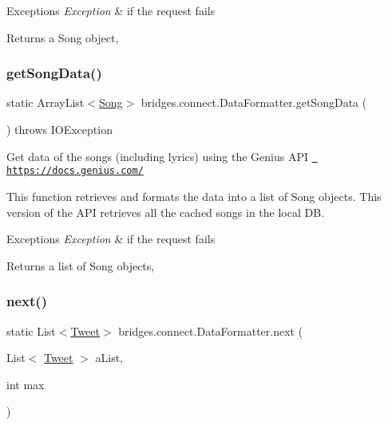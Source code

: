 \begin{DoxyExceptions}{Exceptions}
{\em Exception} & if the request fails\\
\hline
\end{DoxyExceptions}
\begin{DoxyReturn}{Returns}
a Song object, 
\end{DoxyReturn}
\mbox{\label{classbridges_1_1connect_1_1_data_formatter_a6a2ded4ccec11234434b83a3e408fb67}} 
\subsubsection{\texorpdfstring{getSongData()}{getSongData()}}
{\footnotesize\ttfamily static Array\+List$<$\mbox{\hyperlink{classbridges_1_1data__src__dependent_1_1_song}{Song}}$>$ bridges.\+connect.\+Data\+Formatter.\+get\+Song\+Data (\begin{DoxyParamCaption}{ }\end{DoxyParamCaption}) throws I\+O\+Exception\hspace{0.3cm}{\ttfamily [static]}}

Get data of the songs (including lyrics) using the Genius A\+PI \href{https://docs.genius.com/}{\texttt{ https\+://docs.\+genius.\+com/}}

This function retrieves and formats the data into a list of Song objects. This version of the A\+PI retrieves all the cached songs in the local DB.


\begin{DoxyExceptions}{Exceptions}
{\em Exception} & if the request fails\\
\hline
\end{DoxyExceptions}
\begin{DoxyReturn}{Returns}
a list of Song objects, 
\end{DoxyReturn}
\mbox{\label{classbridges_1_1connect_1_1_data_formatter_a3d0b2d2e0384d2a537bb61fbeb3d00a4}} 
\subsubsection{\texorpdfstring{next()}{next()}\hspace{0.1cm}{\footnotesize\ttfamily [1/2]}}
{\footnotesize\ttfamily static List$<$\mbox{\hyperlink{classbridges_1_1data__src__dependent_1_1_tweet}{Tweet}}$>$ bridges.\+connect.\+Data\+Formatter.\+next (\begin{DoxyParamCaption}\item[{List$<$ \mbox{\hyperlink{classbridges_1_1data__src__dependent_1_1_tweet}{Tweet}} $>$}]{a\+List,  }\item[{int}]{max }\end{DoxyParamCaption})\hspace{0.3cm}{\ttfamily [static]}}

